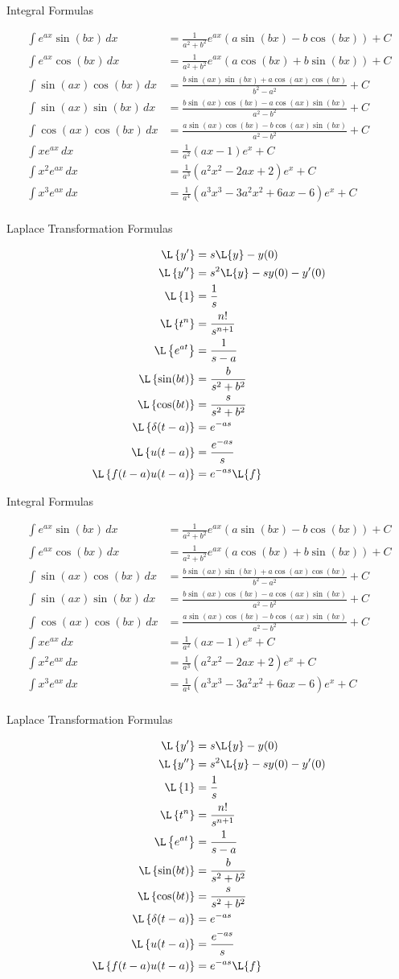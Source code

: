 \documentclass{article}
\newcommand{\tablePage}{
\begin{center}\Huge Integral Formulas\end{center}
\begin{align*}
\int e^{ax}\sin(bx) \,dx &= \frac{1}{a^2+b^2} e^{a x} \left(a \sin(bx) - b\cos(bx)\right)+C \\
\int e^{ax}\cos(bx) \,dx &= \frac{1}{a^2+b^2} e^{a x} \left(a \cos(bx) + b\sin(bx)\right)+C \\
\int \sin(a x) \cos(b x) \,dx &= \frac{b \sin(a x) \sin(b x) + a \cos(a x) \cos(b x)}{b^2 - a^2} + C \\
\int \sin(a x) \sin(b x) \,dx &= \frac{b \sin(a x) \cos(b x) - a \cos(a x) \sin(b x)}{a^2 - b^2} + C \\
\int  \cos(a x) \cos(b x) \,dx &= \frac{a \sin(a x) \cos(b x) - b \cos(a x) \sin(b x)}{a^2 - b^2} + C \\
\int xe^{ax} \,dx &= \frac{1}{a^2}(ax-1)e^x+C \\
\int x^2e^{ax} \,dx &= \frac{1}{a^3}(a^2x^2-2ax+2)e^x+C \\
\int x^3e^{ax} \,dx &= \frac{1}{a^4}(a^3x^3-3a^2x^2+6ax-6)e^x+C \\
\end{align*}

\vfill

\begin{center}\Huge Laplace Transformation Formulas\end{center}
\begin{align*}
\L\left\{y'\right\} &= s\L\{y\}-y(0) \\
\L\left\{y''\right\} &= s^2\L\{y\}-sy(0)-y'(0) \\
\L\left\{1\right\} &= \frac{1}{s} \\
\L\left\{t^n\right\} &= \frac{n!}{s^{n+1}} \\
\L\left\{e^{at}\right\} &= \frac{1}{s-a} \\
\L\left\{ \sin(bt) \right\} &= \frac{b}{s^2+b^2}  \\ 
\L\left\{ \cos(bt) \right\} &= \frac{s}{s^2+b^2}\\ 
\L\left\{ \delta(t-a) \right\} &= e^{-as}  \\ 
\L\left\{ u(t-a)\right\} &= \frac{e^{-as}}{s} \\ 
\L\left\{ f(t-a)u(t-a)\right\} &= e^{-as} \L\{f\} \\ 
\end{align*}
}
\begin{document}
\large
\tablePage

\newpage

\tablePage
\end{document}
